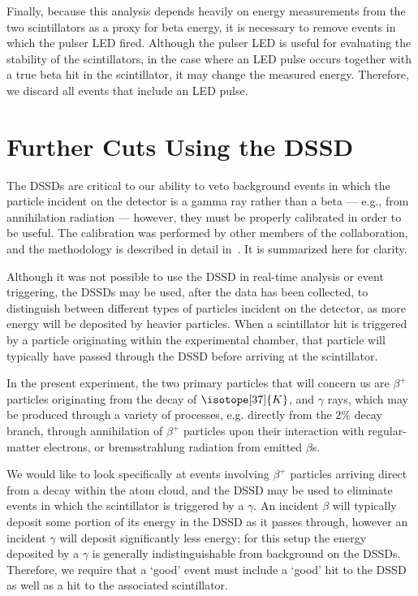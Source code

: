 Finally, because this analysis depends heavily on energy measurements from the two scintillators as a proxy for beta energy, it is necessary to remove events in which the pulser LED fired.  Although the pulser LED is useful for evaluating the stability of the scintillators, in the case where an LED pulse occurs together with a true beta hit in the scintillator, it may change the measured energy.  Therefore, we discard all events that include an LED pulse.   
	


\section{Further Cuts Using the DSSD}
\label{sec:dssd_cuts}

The DSSDs are critical to our ability to veto background events in which the particle incident on the detector is a gamma ray rather than a beta --- e.g., from annihilation radiation --- however, they must be properly calibrated in order to be useful.  The calibration was performed by other members of the collaboration, and the methodology is described in detail in~\cite{ben_thesis}.  It is summarized here for clarity.

Although it was not possible to use the DSSD in real-time analysis or event triggering, the DSSDs may be used, after the data has been collected, to distinguish between different types of particles incident on the detector, as more energy will be deposited by heavier particles.  When a scintillator hit is triggered by a particle originating within the experimental chamber, that particle will typically have passed through the DSSD before arriving at the scintillator.

In the present experiment, the two primary particles that will concern us are $\beta^+$ particles originating from the decay of $\isotope[37]{K}$, and $\gamma$ rays, which may be produced through a variety of processes, e.g. directly from the $2\%$ decay branch, through annihilation of $\beta^+$ particles upon their interaction with regular-matter electrons, or bremsstrahlung radiation from emitted $\beta$s.  

We would like to look specifically at events involving $\beta^+$ particles arriving direct from a decay within the atom cloud, and the DSSD may be used to eliminate events in which the scintillator is triggered by a $\gamma$.  An incident $\beta$ will typically deposit some portion of its energy in the DSSD as it passes through, however an incident $\gamma$ will deposit significantly less energy; for this setup the energy deposited by a $\gamma$ is generally indistinguishable from background on the DSSDs.  Therefore, we require that a `good' event must include a `good' hit to the DSSD as well as a hit to the associated scintillator.   

